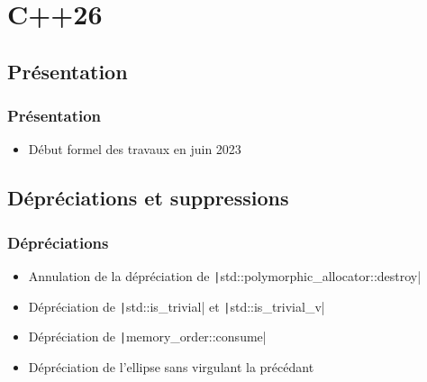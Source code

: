 \documentclass[C++.tex]{subfiles}
\begin{document}
\section{C++26}
\subsection*{Présentation}
\begin{frame}
	\frametitle{Présentation}
	\begin{itemize}
		\item Début formel des travaux en juin 2023
	\end{itemize}
\end{frame}

\subsection*{Dépréciations et suppressions}
\begin{frame}[fragile]
	\frametitle{Dépréciations}
	\begin{itemize}
		\item Annulation de la dépréciation de \texttt|std::polymorphic_allocator::destroy|
		\item Dépréciation de \texttt|std::is_trivial| et \texttt|std::is_trivial_v|
		\item Dépréciation de \texttt|memory_order::consume|
		\item Dépréciation de l'ellipse sans virgulant la précédant
	\end{itemize}

\end{frame}
\end{document}
